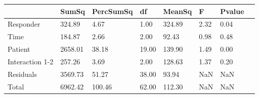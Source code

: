 \begin{tabular}{llllllll}
 & SumSq & PercSumSq & df & MeanSq & F & Pvalue \\ 
 \hline 
Responder & 324.89 & 4.67 & 1.00 & 324.89 & 2.32 & 0.04 \\ 
Time & 184.87 & 2.66 & 2.00 & 92.43 & 0.98 & 0.48 \\ 
Patient & 2658.01 & 38.18 & 19.00 & 139.90 & 1.49 & 0.00 \\ 
Interaction 1-2 & 257.26 & 3.69 & 2.00 & 128.63 & 1.37 & 0.20 \\ 
Residuals & 3569.73 & 51.27 & 38.00 & 93.94 & NaN & NaN \\ 
Total & 6962.42 & 100.46 & 62.00 & 112.30 & NaN & NaN \\ 
\end{tabular} 
